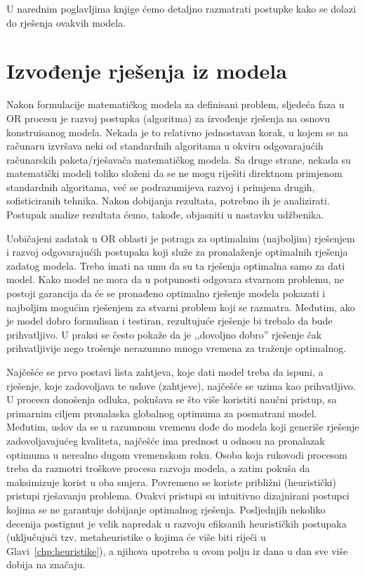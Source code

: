 \documentclass[a4paper, utf8, 11pt, colorlinks]{book}
\theoremstyle{definition}
\begin{document}
U narednim poglavljima knjige ćemo detaljno razmatrati postupke kako se dolazi do rješenja ovakvih modela.
 


\section{Izvođenje rješenja iz modela}


Nakon formulacije matematičkog modela za definisani problem, sljedeća faza u OR procesu  je razvoj postupka (algoritma) za
izvođenje rješenja na osnovu konstruisanog modela. Nekada je to relativno jednostavan korak, u kojem se na računaru izvršava neki od standardnih algoritama u okviru odgovarajućih računarskih paketa/rješavača matematičkog modela. Sa druge strane, nekada su matematički modeli toliko složeni da se ne mogu riješiti direktnom primjenom standardnih algoritama, već se podrazumijeva razvoj i primjena drugih, sofisticiranih tehnika.
Nakon dobijanja rezultata, potrebno ih je analizirati. Postupak analize rezultata ćemo, takođe, objasniti u nastavku udžbenika. 

Uobičajeni zadatak u OR oblasti je potraga za optimalnim (najboljim) rješenjem i razvoj odgovarajućih postupaka koji služe za pronala\-ženje optimalnih rješenja zadatog modela. Treba imati na umu da su ta rješenja optimalna samo za dati model. Kako model ne mora da u potpunosti odgovara stvarnom problemu, ne postoji garancija da će se pronađeno optimalno rješenje modela pokazati i najboljim mogućim rješenjem za stvarni problem koji se razmatra. Međutim, ako je
model dobro formulisan i testiran, rezultujuće rješenje  bi trebalo da bude prihvatljivo. U praksi se često pokaže da je ,,dovoljno dobro'' rješenje čak prihvatljivije nego trošenje nerazumno mnogo vremena za traženje optimalnog.

Najčešće se prvo postavi lista zahtjeva, koje dati model treba da ispuni, a rješenje, koje zadovoljava te uslove (zahtjeve), najčešće se   uzima kao prihvatljivo. U procesu donošenja odluka, pokušava se što više  koristiti naučni pristup, sa primarnim ciljem pronalaska globalnog optimuma za posmatrani model. Međutim,  uslov da se u razumnom vremenu dođe do modela koji generiše rješenje  zadovoljavajućeg kvaliteta, najčešće ima prednost u odnosu na pronalazak optimuma u nerealno dugom vremenskom roku. Osoba koja rukovodi procesom treba da razmotri troškove procesa razvoja modela, a zatim
pokuša da maksimizuje korist u oba smjera. Povremeno se koriste   približni (heuristički) pristupi rješavanju problema. Ovakvi pristupi su intuitivno dizajnirani postupci kojima se ne garantuje dobijanje optimalnog rješenja. Posljednjih nekoliko decenija postignut je velik napredak u razvoju efiksanih heurističkih postupaka (uključujući tzv. metaheuristike o kojima će više biti riječi u Glavi~\ref{chp:heuristike}), a njihova upotreba u ovom polju iz dana u dan sve više dobija na značaju.  
\end{document}
